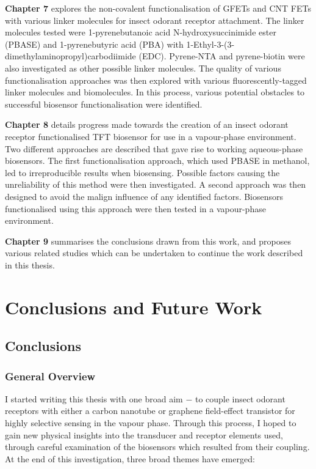 \documentclass[
  a4paper,
]{scrbook}
\begin{document}
\textbf{Chapter 7} explores the non-covalent functionalisation of GFETs
and CNT FETs with various linker molecules for insect odorant receptor
attachment. The linker molecules tested were 1-pyrenebutanoic acid
N-hydroxysuccinimide ester (PBASE) and 1-pyrenebutyric acid (PBA) with
1-Ethyl-3-(3-dimethylaminopropyl)carbodiimide (EDC). Pyrene-NTA and
pyrene-biotin were also investigated as other possible linker molecules.
The quality of various functionalisation approaches was then explored
with various fluorescently-tagged linker molecules and biomolecules. In
this process, various potential obstacles to successful biosensor
functionalisation were identified.

\textbf{Chapter 8} details progress made towards the creation of an
insect odorant receptor functionalised TFT biosensor for use in a
vapour-phase environment. Two different approaches are described that
gave rise to working aqueous-phase biosensors. The first
functionalisation approach, which used PBASE in methanol, led to
irreproducible results when biosensing. Possible factors causing the
unreliability of this method were then investigated. A second approach
was then designed to avoid the malign influence of any identified
factors. Biosensors functionalised using this approach were then tested
in a vapour-phase environment.

\textbf{Chapter 9} summarises the conclusions drawn from this work, and
proposes various related studies which can be undertaken to continue the
work described in this thesis.


\hypertarget{conclusions-and-future-work}{%
\chapter{Conclusions and Future
Work}\label{conclusions-and-future-work}}

\hypertarget{sec-conclusions}{%
\section{Conclusions}\label{sec-conclusions}}

\hypertarget{general-overview}{%
\subsection{General Overview}\label{general-overview}}

I started writing this thesis with one broad aim \(-\) to couple insect
odorant receptors with either a carbon nanotube or graphene field-effect
transistor for highly selective sensing in the vapour phase. Through
this process, I hoped to gain new physical insights into the transducer
and receptor elements used, through careful examination of the
biosensors which resulted from their coupling. At the end of this
investigation, three broad themes have emerged:
\end{document}

